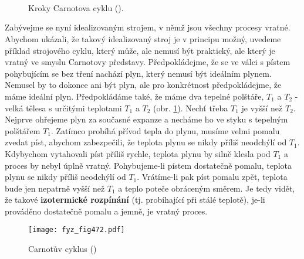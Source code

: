     \begin{figure}[hb!] %
      \centering
        \\
        \\
        \\
      \caption{Kroky Carnotova cyklu (\cite[s.~601]{Feynman01}).}
      \label{fyz:fig471}
    \end{figure}

    Zabývejme se nyní idealizovaným strojem, v němž jsou všechny procesy vratné. Abychom ukázali, že
    takový idealizovaný stroj je v principu možný, uvedeme příklad strojového cyklu, který může, ale
    nemusí být praktický, ale který je vratný ve smyslu Carnotovy představy. Předpokládejme, že se
    ve válci s pístem pohybujícím se bez tření nachází plyn, který nemusí být ideálním plynem.
    Nemusel by to dokonce ani být plyn, ale pro konkrétnost předpokládejme, že máme ideální plyn.
    Předpokládáme také, že máme dva tepelné polštáře, \(T_1\) a \(T_2\) - velká tělesa s určitými
    teplotami \(T_1\) a \(T_2\) (obr. \ref{fyz:fig471}). Nechť třeba \(T_1\) je vyšší než \(T_2\).
    Nejprve ohřejeme plyn za současné expanze a necháme ho ve styku s tepelným polštářem \(T_1\).
    Zatímco probíhá přívod tepla do plynu, musíme velmi pomalu zvedat píst, abychom zabezpečili, že
    teplota plynu se nikdy příliš neodchýlí od \(T_1\). Kdybychom vytahovali píst příliš rychle,
    teplota plynu by silně klesla pod \(T_1\) a proces by nebyl úplně vratný. Pohybujeme-li pístem
    dostatečně pomalu, teplota plynu se nikdy příliš neodchýlí od \(T_1\). Vrátíme-li pak píst
    pomalu zpět, teplota bude jen nepatrně vyšší než \(T_1\) a teplo poteče obráceným směrem. Je
    tedy vidět, že takové \textbf{izotermické rozpínání} (tj. probíhající při stálé teplotě), je-li
    prováděno dostatečně pomalu a jemně, je vratný proces.

    \begin{figure}[ht!] %
      \centering
      \texttt{[image: fyz\_fig472.pdf]}
      \caption{Carnotův cyklus (\cite[s.~707]{Feynman01})}
      \label{fyz:fig472}
    \end{figure}

